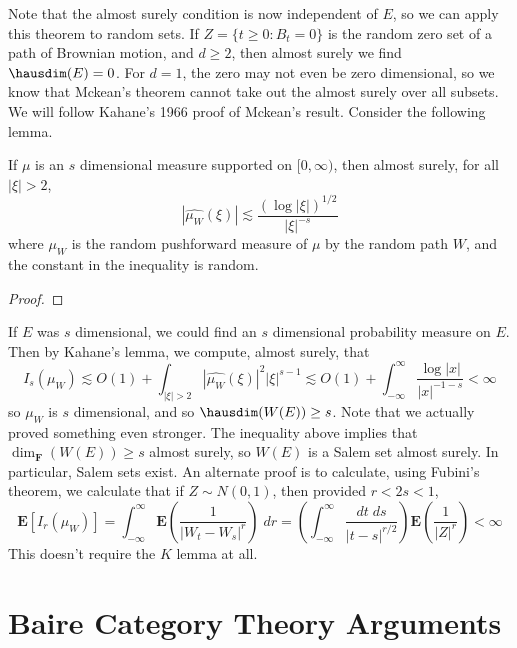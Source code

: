 Note that the almost surely condition is now independent of $E$, so we can apply this theorem to random sets. If $Z = \{ t \geq 0: B_t = 0 \}$ is the random zero set of a path of Brownian motion, and $d \geq 2$, then almost surely we find $\hausdim(E) = 0$. For $d = 1$, the zero may not even be zero dimensional, so we know that Mckean's theorem cannot take out the almost surely over all subsets. We will follow Kahane's 1966 proof of Mckean's result. Consider the following lemma.

\begin{lemma}
	If $\mu$ is an $s$ dimensional measure supported on $[0,\infty)$, then almost surely, for all $|\xi| > 2$,
	\[ |\widehat{\mu_W}(\xi)| \lesssim \frac{(\log |\xi|)^{1/2}}{|\xi|^{-s}} \]
	where $\mu_W$ is the random pushforward measure of $\mu$ by the random path $W$, and the constant in the inequality is random.
\end{lemma}
\begin{proof}
	
\end{proof}

If $E$ was $s$ dimensional, we could find an $s$ dimensional probability measure on $E$. Then by Kahane's lemma, we compute, almost surely, that
%
\[ I_s(\mu_W) \lesssim O(1) + \int_{|\xi| > 2} |\widehat{\mu_W}(\xi)|^2 |\xi|^{s-1} \lesssim O(1) + \int_{-\infty}^\infty \frac{\log |x|}{|x|^{-1-s}} < \infty \]
%
so $\mu_W$ is $s$ dimensional, and so $\hausdim(W(E)) \geq s$. Note that we actually proved something even stronger. The inequality above implies that $\dim_{\mathbf{F}}(W(E)) \geq s$ almost surely, so $W(E)$ is a Salem set almost surely. In particular, Salem sets exist. An alternate proof is to calculate, using Fubini's theorem, we calculate that if $Z \sim N(0,1)$, then provided $r < 2s < 1$,
	\[ \mathbf{E}[I_r(\mu_W)] = \int_{-\infty}^\infty \mathbf{E} \left( \frac{1}{|W_t - W_s|^r} \right)\; dr = \left( \int_{-\infty}^\infty \frac{dt\; ds}{|t-s|^{r/2}} \right) \mathbf{E} \left( \frac{1}{|Z|^r} \right) < \infty \]
	This doesn't require the $K$ lemma at all.







\chapter{Baire Category Theory Arguments}

